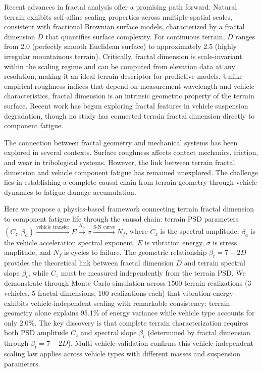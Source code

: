 \documentclass[11pt,letterpaper]{article}
\begin{document}
Recent advances in fractal analysis offer a promising path forward. Natural terrain exhibits self-affine scaling properties across multiple spatial scales\cite{Mandelbrot1982,Sayles1978,Persson2005}, consistent with fractional Brownian surface models\cite{MandelbrotVanNess1968,Mandelbrot1982}, characterized by a fractal dimension $D$ that quantifies surface complexity. For continuous terrain, $D$ ranges from 2.0 (perfectly smooth Euclidean surface) to approximately 2.5 (highly irregular mountainous terrain). Critically, fractal dimension is scale-invariant within the scaling regime and can be computed from elevation data at any resolution, making it an ideal terrain descriptor for predictive models. Unlike empirical roughness indices that depend on measurement wavelength and vehicle characteristics, fractal dimension is an intrinsic geometric property of the terrain surface. Recent work has begun exploring fractal features in vehicle suspension degradation\cite{Braut2023}, though no study has connected terrain fractal dimension directly to component fatigue.

The connection between fractal geometry and mechanical systems has been explored in several contexts. Surface roughness affects contact mechanics, friction, and wear in tribological systems\cite{Persson2005}. However, the link between terrain fractal dimension and vehicle component fatigue has remained unexplored. The challenge lies in establishing a complete causal chain from terrain geometry through vehicle dynamics to fatigue damage accumulation.

Here we propose a physics-based framework connecting terrain fractal dimension to component fatigue life through the causal chain: terrain PSD parameters $(C_z, \beta_a) \xrightarrow{\text{vehicle transfer}} E \xrightarrow{K_\sigma} \sigma \xrightarrow{\text{S-N curve}} N_f$, where $C_z$ is the spectral amplitude, $\beta_a$ is the vehicle acceleration spectral exponent, $E$ is vibration energy, $\sigma$ is stress amplitude, and $N_f$ is cycles to failure. The geometric relationship $\beta_t = 7-2D$ provides the theoretical link between fractal dimension $D$ and terrain spectral slope $\beta_t$, while $C_z$ must be measured independently from the terrain PSD. We demonstrate through Monte Carlo simulation across 1500 terrain realizations (3 vehicles, 5 fractal dimensions, 100 realizations each) that vibration energy exhibits vehicle-independent scaling with remarkable consistency: terrain geometry alone explains 95.1\% of energy variance while vehicle type accounts for only 2.0\%. The key discovery is that complete terrain characterization requires both PSD amplitude $C_z$ and spectral slope $\beta_t$ (determined by fractal dimension through $\beta_t = 7-2D$). Multi-vehicle validation confirms this vehicle-independent scaling law applies across vehicle types with different masses and suspension parameters.
\end{document}
